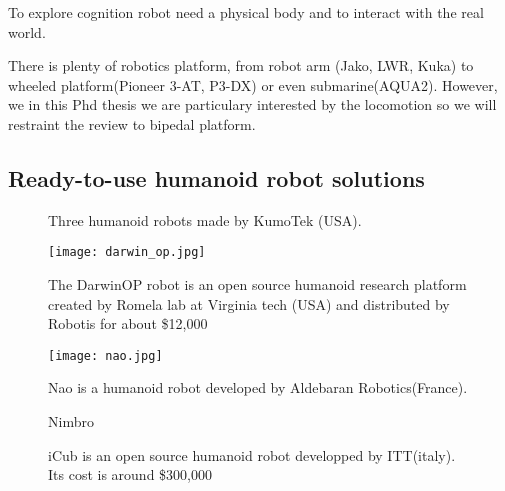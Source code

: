 To explore cognition robot need a physical body and to interact with the real world.


There is plenty of robotics platform, from robot arm (Jako, LWR, Kuka) to wheeled platform(Pioneer 3-AT, P3-DX) or even submarine(AQUA2). However, we in this Phd thesis we are particulary interested by the locomotion so we will restraint the review to bipedal platform.

\subsection{Ready-to-use humanoid robot solutions} %


\begin{figure}[]
\centering
    \hfil
    \hfil
    \caption{Three humanoid robots made by KumoTek (USA).}
    \label{fig:kumotek_robots}
\end{figure}


\begin{figure}[]
    \begin{center}
        \texttt{[image: darwin\_op.jpg]}
    \end{center}
    \caption{The DarwinOP robot is an open source humanoid research platform created by Romela lab at Virginia tech (USA) and distributed by Robotis for about \$12,000}
    \label{fig:darwin_op}
\end{figure}


\begin{figure}[]
    \begin{center}
        \texttt{[image: nao.jpg]}
    \end{center}
    \caption{Nao is a humanoid robot developed by Aldebaran Robotics(France).}
    \label{fig:nao_robot}
\end{figure}


\begin{figure}[]
\centering
    \hfil
    \caption{Nimbro}
    \label{fig:nimbro_op_robot}
\end{figure}


\begin{figure}[]
\centering
    \hfil
    \caption{iCub is an open source humanoid robot developped by ITT(italy). Its cost is around \$300,000}
    \label{fig:icub_robot}
\end{figure}


